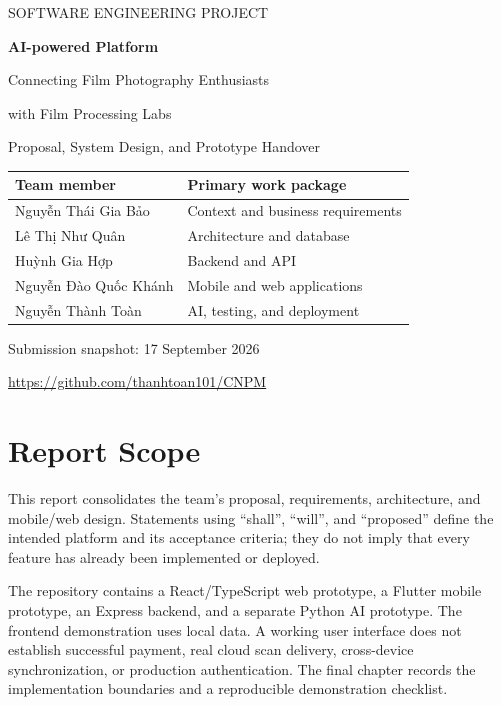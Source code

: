 \documentclass[a4paper,11pt,oneside]{book}
\begin{document}
\hypersetup{pageanchor=false}
\begin{titlepage}
\centering
{\Large SOFTWARE ENGINEERING PROJECT\par}
\vspace{12mm}
{\Huge\bfseries AI-powered Platform\par}
\vspace{4mm}
{\LARGE Connecting Film Photography Enthusiasts\par}
\vspace{2mm}
{\LARGE with Film Processing Labs\par}
\vspace{12mm}
{\large Proposal, System Design, and Prototype Handover\par}
\vspace{15mm}
\begin{tabular}{ll}
\toprule
\textbf{Team member} & \textbf{Primary work package}\\
\midrule
Nguyễn Thái Gia Bảo & Context and business requirements\\
Lê Thị Như Quân & Architecture and database\\
Huỳnh Gia Hợp & Backend and API\\
Nguyễn Đào Quốc Khánh & Mobile and web applications\\
Nguyễn Thành Toàn & AI, testing, and deployment\\
\bottomrule
\end{tabular}
\vfill
{\large Submission snapshot: 17 September 2026\par}
\vspace{5mm}
\url{https://github.com/thanhtoan101/CNPM}
\end{titlepage}

\frontmatter
\hypersetup{pageanchor=true}
\chapter*{Report Scope}
This report consolidates the team's proposal, requirements, architecture, and
mobile/web design. Statements using ``shall'', ``will'', and ``proposed'' define
the intended platform and its acceptance criteria; they do not imply that every
feature has already been implemented or deployed.

The repository contains a React/TypeScript web prototype, a Flutter mobile
prototype, an Express backend, and a separate Python AI prototype. The frontend
demonstration uses local data. A working user interface does not establish
successful payment, real cloud scan delivery, cross-device synchronization,
or production authentication. The final chapter records the implementation
boundaries and a reproducible demonstration checklist.
\end{document}
